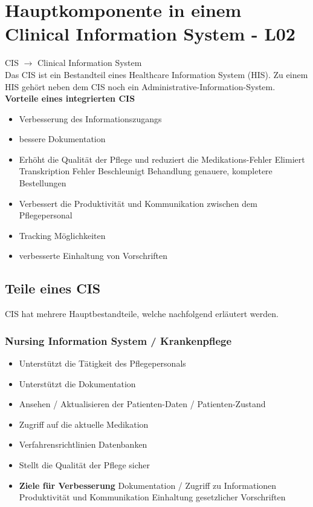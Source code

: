 \documentclass{report}
\theoremstyle{definition}
\theoremstyle{example}
\begin{document}
\chapter{Hauptkomponente in einem Clinical Information System - L02}
CIS $\rightarrow$ Clinical Information System\\
Das CIS ist ein Bestandteil eines Healthcare Information System (HIS). Zu einem HIS gehört neben dem CIS noch ein Administrative-Information-System.\\

\textbf{Vorteile eines integrierten CIS}
\begin{itemize}
   \item Verbesserung des Informationszugangs
   \item bessere Dokumentation
   \item Erhöht die Qualität der Pflege und reduziert die Medikations-Fehler 
   \subitem Elimiert Transkription Fehler
   \subitem Beschleunigt Behandlung
   \subitem genauere, kompletere Bestellungen
   \item Verbessert die Produktivität und Kommunikation zwischen dem Pflegepersonal
   \item Tracking Möglichkeiten
   \item verbesserte Einhaltung von Vorschriften 
\end{itemize}

\section{Teile eines CIS}
CIS hat mehrere Hauptbestandteile, welche nachfolgend erläutert werden.

\subsection{Nursing Information System / Krankenpflege}
\begin{itemize}
   \item Unterstützt die Tätigkeit des Pflegepersonals
   \item Unterstützt die Dokumentation 
   \item Ansehen / Aktualisieren der Patienten-Daten / Patienten-Zustand
   \item Zugriff auf die aktuelle Medikation 
   \item Verfahrensrichtlinien Datenbanken
   \item Stellt die Qualität der Pflege sicher
   \item \textbf{Ziele für Verbesserung}
   \subitem Dokumentation / Zugriff zu Informationen
   \subitem Produktivität und Kommunikation
   \subitem Einhaltung gesetzlicher Vorschriften
\end{itemize}
\end{document}
